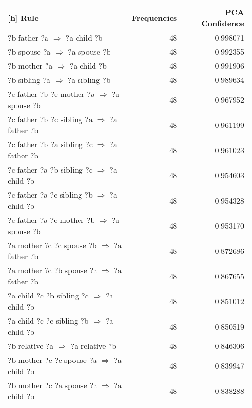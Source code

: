 \newpage
\begin{longtable}{lrr}[h]
\toprule
                                                    Rule &  Frequencies &  PCA Confidence \\
\midrule
                       ?b  father  ?a   $\Rightarrow$ ?a  child  ?b &           48 &        0.998071 \\
                      ?b  spouse  ?a   $\Rightarrow$ ?a  spouse  ?b &           48 &        0.992355 \\
                       ?b  mother  ?a   $\Rightarrow$ ?a  child  ?b &           48 &        0.991906 \\
                    ?b  sibling  ?a   $\Rightarrow$ ?a  sibling  ?b &           48 &        0.989634 \\
      ?c  father  ?b  ?c  mother  ?a   $\Rightarrow$ ?a  spouse  ?b &           48 &        0.967952 \\
     ?c  father  ?b  ?c  sibling  ?a   $\Rightarrow$ ?a  father  ?b &           48 &        0.961199 \\
     ?c  father  ?b  ?a  sibling  ?c   $\Rightarrow$ ?a  father  ?b &           48 &        0.961023 \\
      ?c  father  ?a  ?b  sibling  ?c   $\Rightarrow$ ?a  child  ?b &           48 &        0.954603 \\
      ?c  father  ?a  ?c  sibling  ?b   $\Rightarrow$ ?a  child  ?b &           48 &        0.954328 \\
      ?c  father  ?a  ?c  mother  ?b   $\Rightarrow$ ?a  spouse  ?b &           48 &        0.953170 \\
      ?a  mother  ?c  ?c  spouse  ?b   $\Rightarrow$ ?a  father  ?b &           48 &        0.872686 \\
      ?a  mother  ?c  ?b  spouse  ?c   $\Rightarrow$ ?a  father  ?b &           48 &        0.867655 \\
       ?a  child  ?c  ?b  sibling  ?c   $\Rightarrow$ ?a  child  ?b &           48 &        0.851012 \\
       ?a  child  ?c  ?c  sibling  ?b   $\Rightarrow$ ?a  child  ?b &           48 &        0.850519 \\
                  ?b  relative  ?a   $\Rightarrow$ ?a  relative  ?b &           48 &        0.846306 \\
       ?b  mother  ?c  ?c  spouse  ?a   $\Rightarrow$ ?a  child  ?b &           48 &        0.839947 \\
       ?b  mother  ?c  ?a  spouse  ?c   $\Rightarrow$ ?a  child  ?b &           48 &        0.838288 \\

\end{longtable}
